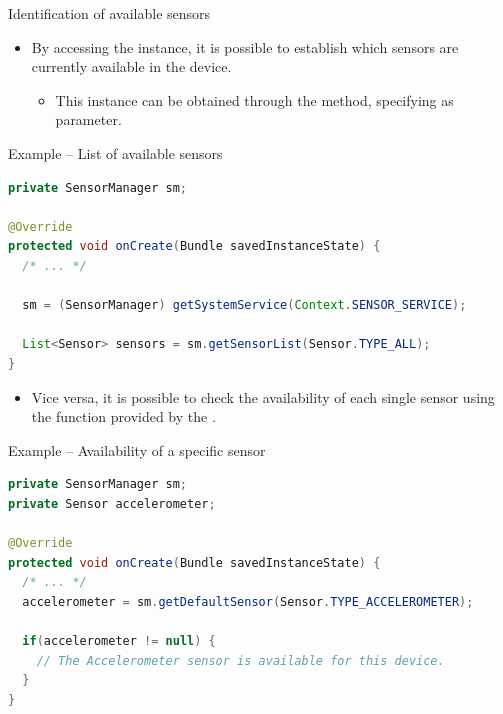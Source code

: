 \documentclass{beamer}
\begin{document}
  \begin{frame}{Identification of available sensors}
    \begin{itemize}
      \item By accessing the  instance, it is possible to establish
      which sensors are currently available in the device.
      \begin{itemize}
        \item This instance can be obtained through the
         method, specifying
         as parameter.
      \end{itemize}
    \end{itemize}

    \begin{exampleblock}{Example -- List of available sensors}
      \begin{lstlisting}[language=Java]  
private SensorManager sm;
      
@Override
protected void onCreate(Bundle savedInstanceState) {
  /* ... */
    
  sm = (SensorManager) getSystemService(Context.SENSOR_SERVICE);

  List<Sensor> sensors = sm.getSensorList(Sensor.TYPE_ALL);
}
      \end{lstlisting}
    \end{exampleblock}

    \begin{itemize}
      \item Vice versa, it is possible to check the availability of each single
      sensor using the  function provided by the
      .
    \end{itemize}

    \begin{exampleblock}{Example -- Availability of a specific sensor}
      \begin{lstlisting}[language=Java]  
private SensorManager sm;
private Sensor accelerometer;  

@Override
protected void onCreate(Bundle savedInstanceState) {
  /* ... */
  accelerometer = sm.getDefaultSensor(Sensor.TYPE_ACCELEROMETER);
    
  if(accelerometer != null) {
    // The Accelerometer sensor is available for this device. 
  }
}
      \end{lstlisting}
    \end{exampleblock}
  \end{frame}
\end{document}
